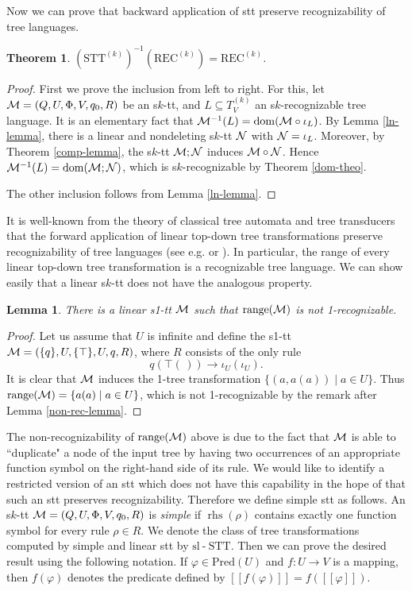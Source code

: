 \documentclass[10pt]{scrartcl}
\newtheorem{lm}[df]{Lemma}
\newtheorem{theo}[df]{Theorem}
\newcommand{\seml}{[\![}
\newcommand{\semr}{]\!]}
\newcommand{\Pred}{\mathrm{Pred}}
\newcommand{\REC}{\mathrm{REC}}
\newcommand{\STT}{\mathrm{STT}}
\newcommand{\slSTT}{\mathrm{sl}\n\mathrm{STT}}
\newcommand{\M}{{\cal M}}
\newcommand{\N}{{\cal N}}
\DeclareMathOperator{\dom}{dom}
\DeclareMathOperator{\rhs}{rhs}
\DeclareMathOperator{\range}{range}
\DeclareMathOperator{\n}{-}
\def\ui#1{^{(#1)}}
\begin{document}
Now we can prove that backward application of stt preserve recognizability of tree languages.

\begin{theo} \label{backward-theo}$(\STT\ui k)^{-1}(\REC\ui k) = \REC\ui k$.
\end{theo}
\begin{proof} First we prove the inclusion from left to right. For this, let $\M = (Q,U,\Phi,V,q_0,R)$ be an s$k$-tt, and $L\subseteq T_V\ui k$ an s$k$-recognizable tree language. It is an elementary fact that $\M^{-1}(L) = \dom(\M\circ\iota_L)$. By Lemma \ref{ln-lemma}, there is a linear and nondeleting s$k$-tt $\N$
with $\N = \iota_L$. Moreover, by Theorem \ref{comp-lemma}, the s$k$-tt $\M;\N$ induces $\M\circ \N$. Hence $\M^{-1}(L) = \dom(\M;\N)$, which is s$k$-recognizable by Theorem \ref{dom-theo}.

The other inclusion follows from Lemma \ref{ln-lemma}.
\end{proof} 

It is well-known from the theory of classical tree automata and tree transducers that the forward application of linear top-down tree transformations preserve recognizability of tree languages (see e.g. \cite{tha69} or \cite[Ch. IV, Cor. 6.6]{gecste84}). In particular, the range of every linear top-down tree transformation is a recognizable tree language. We can show easily that a linear s$k$-tt does not have the analogous property.

\begin{lm} \label{range-lin-lemma}\rm There is a linear s1-tt $\M$ such that $\range(\M)$ is not 1-recognizable.
\end{lm}
\begin{proof} Let us assume that $U$ is infinite and define the s1-tt $\M = (\{q\},U,\{\top\},U,q,R)$, where $R$ consists of the only rule
$$q(\top(\,))\to \iota_U(\iota_U).$$
It is clear that $\M$ induces the 1-tree transformation $\{(a,a(a))\mid a\in U\}$. Thus $\range(\M)= \{a(a)\mid a\in U\}$, which is not 1-recognizable
by the remark after Lemma \ref{non-rec-lemma}.
\end{proof}

The non-recognizability of $\range(\M)$ above is due to the fact that
$\M$ is able to ``duplicate" a node of the input tree by having two
occurrences of an appropriate function symbol on the right-hand side
of its rule. We would like to identify a restricted version of an stt
which does not have this capability in the hope of that such an stt
preserves recognizability. Therefore we define simple stt as
follows. An s$k$-tt $\M = (Q,U,\Phi,V,q_0,R)$ is {\em simple} if
$\rhs(\rho)$ contains exactly one function symbol for every rule $\rho
\in R$. We denote the class of tree transformations computed by simple
and linear stt by $\slSTT$. Then we can prove the desired result using
the following notation. If $\varphi \in \Pred(U)$ and $f: U
\rightarrow V$ is a mapping, then $f(\varphi)$ denotes the
predicate defined by $\seml f(\varphi) \semr = f(\seml \varphi \semr)$.
\end{document}
